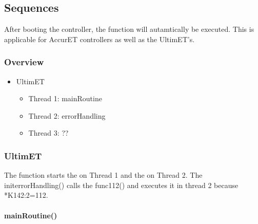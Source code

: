 \subsection{Sequences}
After booting the controller, the function  will autamtically be executed. This is applicable for AccurET controllers as well as the UltimET's. 
\subsubsection{Overview}
\begin{itemize}
	\item UltimET
	\begin{itemize}
		\item Thread 1: mainRoutine
		\item Thread 2: errorHandling
		\item Thread 3: ??
	\end{itemize}
\end{itemize}
\subsubsection{UltimET}
The  function starts the  on Thread 1 and the  on Thread 2.
The initerrorHandling() calls the func112() and executes it in thread 2 because *K142:2=112.
\paragraph{mainRoutine()}
